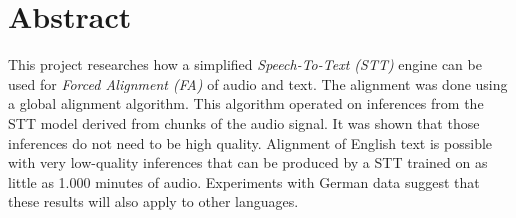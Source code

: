\section*{Abstract}

This project researches how a simplified \textit{Speech-To-Text (STT)} engine can be used for \textit{Forced Alignment (FA)} of audio and text. The alignment was done using a global alignment algorithm. This algorithm operated on inferences from the STT model derived from chunks of the audio signal. It was shown that those inferences do not need to be high quality. Alignment of English text is possible with very low-quality inferences that can be produced by a STT trained on as little as 1.000 minutes of audio. Experiments with German data suggest that these results will also apply to other languages.